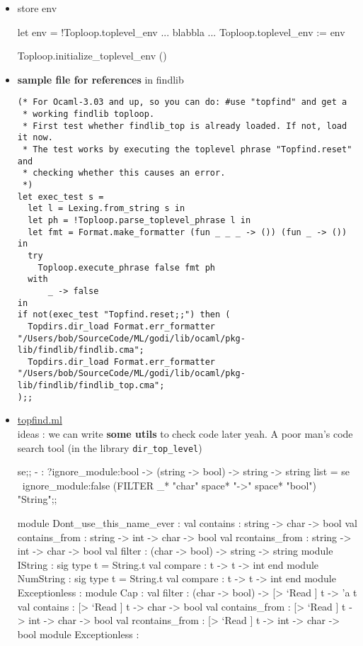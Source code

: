 \begin{enumerate}
\begin{itemize}
\item store env

  \begin{bluecode}
let env = !Toploop.toplevel_env
... blabbla ...     
Toploop.toplevel_env := env     
\end{bluecode}
\begin{bluecode}
Toploop.initialize_toplevel_env ()  
\end{bluecode}
  \item \textbf{sample file  for references } in findlib


\begin{lstlisting}[caption=Toplevel Code Sample,label=toplevel]
(* For Ocaml-3.03 and up, so you can do: #use "topfind" and get a
 * working findlib toploop.
 * First test whether findlib_top is already loaded. If not, load it now.
 * The test works by executing the toplevel phrase "Topfind.reset" and
 * checking whether this causes an error.
 *)
let exec_test s =
  let l = Lexing.from_string s in
  let ph = !Toploop.parse_toplevel_phrase l in
  let fmt = Format.make_formatter (fun _ _ _ -> ()) (fun _ -> ()) in
  try
    Toploop.execute_phrase false fmt ph
  with
      _ -> false
in
if not(exec_test "Topfind.reset;;") then (
  Topdirs.dir_load Format.err_formatter "/Users/bob/SourceCode/ML/godi/lib/ocaml/pkg-lib/findlib/findlib.cma";
  Topdirs.dir_load Format.err_formatter "/Users/bob/SourceCode/ML/godi/lib/ocaml/pkg-lib/findlib/findlib_top.cma";
);;
\end{lstlisting}

    
  \item \href{file:/Users/bob/SourceCode/ML/godi/build/distfiles/findlib-1.2.7/src/findlib/topfind.ml}{topfind.ml} \\
    ideas : we can write \textbf{some utils} to check code later 
    yeah. A poor man's code search tool (in the library \verb|dir_top_level|)


\begin{alternate}
se;;
- : ?ignore_module:bool -> (string -> bool) -> string -> string list =
se ~ignore_module:false (FILTER _*  "char" space* "->" space* "bool") "String";;
\end{alternate}

\begin{bluecode}
module Dont_use_this_name_ever :
    val contains : string -> char -> bool
    val contains_from : string -> int -> char -> bool
    val rcontains_from : string -> int -> char -> bool
    val filter : (char -> bool) -> string -> string
    module IString : sig type t = String.t val compare : t -> t -> int end
    module NumString : sig type t = String.t val compare : t -> t -> int end
    module Exceptionless :
    module Cap :
        val filter : (char -> bool) -> [> `Read ] t -> 'a t
        val contains : [> `Read ] t -> char -> bool
        val contains_from : [> `Read ] t -> int -> char -> bool
        val rcontains_from : [> `Read ] t -> int -> char -> bool
        module Exceptionless :
\end{bluecode}



\end{itemize}
\end{enumerate}
